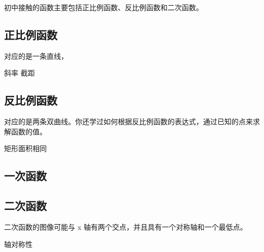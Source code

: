 
\begin{issues}
\issueDraft
\end{issues}

初中接触的函数主要包括正比例函数、反比例函数和二次函数。

\subsection{正比例函数}

对应的是一条直线，

斜率
截距

\subsection{反比例函数}

对应的是两条双曲线。你还学过如何根据反比例函数的表达式，通过已知的点来求解函数的值。



矩形面积相同


\subsection{一次函数}

\subsection{二次函数}

二次函数的图像可能与  x  轴有两个交点，并且具有一个对称轴和一个最低点。

轴对称性